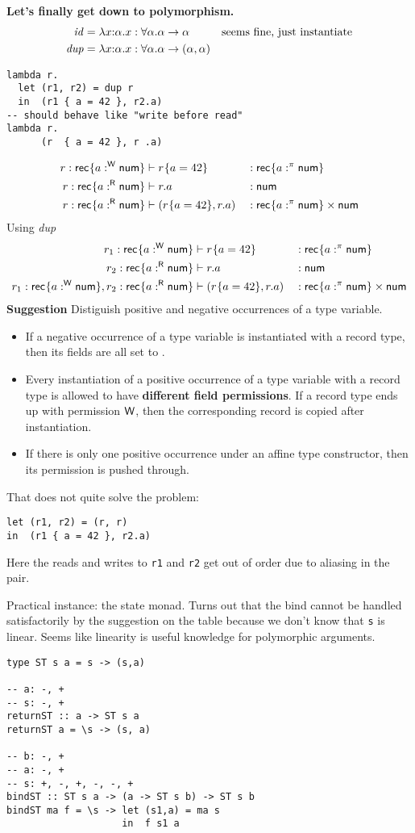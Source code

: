 \documentclass{llncs}
\begin{document}
\textbf{Let's finally get down to polymorphism. }
\begin{align*}
  \mathit{id} =
  \lambda x{:}\alpha. x & : \forall\alpha.\alpha\to\alpha
  &&\text{seems fine, just instantiate}
  \\
  \mathit{dup} =
  \lambda x{:}\alpha. x & : \forall\alpha.\alpha\to(\alpha,\alpha)
\end{align*}
\begin{verbatim}
lambda r.
  let (r1, r2) = dup r 
  in  (r1 { a = 42 }, r2.a)
-- should behave like "write before read"
lambda r. 
      (r  { a = 42 }, r .a)
\end{verbatim}
\begin{align*}
  r : \textsf{rec}^{{}}\{ a:^\textsf{W} \textsf{num}\} & \vdash r^{{}}\{a=42\} &&: \textsf{rec}^{{}}\{ a:^\pi \textsf{num}\}
  \\
  r : \textsf{rec}^{{}}\{ a:^\textsf{R} \textsf{num}\} & \vdash  r. a &&: \textsf{num}
  \\
  r : \textsf{rec}^{{}}\{ a:^\textsf{R} \textsf{num}\} & \vdash (r^{{}}\{a=42\}, r. a)  &&: \textsf{rec}^{{}}\{ a:^\pi \textsf{num}\} \times \textsf{num}
\end{align*}
Using \textit{dup}
\begin{align*}
  r_1 : \textsf{rec}^{{}}\{ a:^\textsf{W} \textsf{num}\} & \vdash r^{{}}\{a=42\} &&: \textsf{rec}^{{}}\{ a:^\pi \textsf{num}\}
  \\
  r_2 : \textsf{rec}^{{}}\{ a:^\textsf{R} \textsf{num}\} & \vdash  r. a &&: \textsf{num}
  \\
  r_1 : \textsf{rec}^{{}}\{ a:^\textsf{W} \textsf{num}\},
  r_2 : \textsf{rec}^{{}}\{ a:^\textsf{R} \textsf{num}\} & \vdash  (r^{{}}\{a=42\} , r. a) &&: \textsf{rec}^{{}}\{ a:^\pi \textsf{num}\} \times \textsf{num}
\end{align*}
\textbf{Suggestion}
Distiguish positive and negative occurrences of a type variable.
\begin{itemize}
\item If a negative occurrence of a type variable is instantiated with a record type, then its fields are all set to
  \READ.
\item Every instantiation of a positive occurrence of a type variable with a record type is allowed
  to have \textbf{different field permissions}. If a record type ends up with permission $\textsf{W}$,
  then the corresponding record is copied after instantiation.
\item If there is only one positive occurrence under an affine type constructor, then its permission
  is pushed through.
\end{itemize}
That does not quite solve the problem:
\begin{verbatim}
let (r1, r2) = (r, r)
in  (r1 { a = 42 }, r2.a)
\end{verbatim}
Here the reads and writes to \texttt{r1} and \texttt{r2} get out of order due to aliasing in the
pair.

Practical instance: the state monad. Turns out that the bind cannot be handled satisfactorily by the
suggestion on the table because we don't know that \texttt{s} is linear. Seems like linearity is
useful knowledge for polymorphic arguments.
\begin{verbatim}
type ST s a = s -> (s,a)

-- a: -, +
-- s: -, +
returnST :: a -> ST s a
returnST a = \s -> (s, a)

-- b: -, +
-- a: -, +
-- s: +, -, +, -, -, +
bindST :: ST s a -> (a -> ST s b) -> ST s b
bindST ma f = \s -> let (s1,a) = ma s 
                    in  f s1 a
\end{verbatim}
\end{document}
